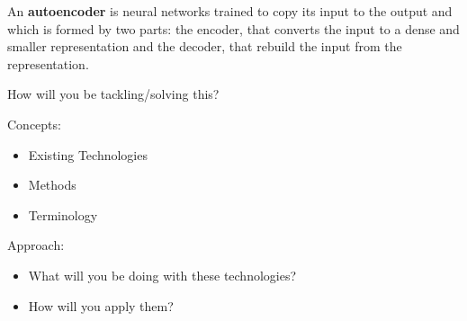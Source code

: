 An \textbf{autoencoder} is neural networks trained to copy its input to the output and which is formed by two parts: the encoder, that converts the input to a dense and smaller representation and the decoder, that rebuild the input from the representation. \begin{flushleft}
    
\end{flushleft}


\hrulefill

How will you be tackling/solving this?



Concepts:
\begin{itemize}
\item Existing Technologies
\item Methods
\item Terminology
\end{itemize}

Approach:
\begin{itemize}
\item What will you be doing with these technologies?
\item How will you apply them?
\end{itemize}